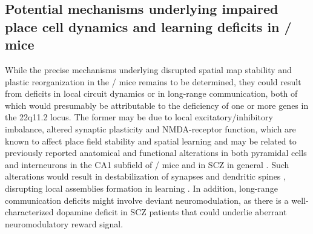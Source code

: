 \subsection{Potential mechanisms underlying impaired place cell dynamics and learning deficits in \df/ mice}

While the precise mechanisms underlying disrupted spatial map stability and plastic reorganization in the \df/ mice remains to be determined, they could result from deficits in local circuit dynamics or in long-range communication, both of which would presumably be attributable to the deficiency of one or more genes in the 22q11.2 locus. The former may be due to local excitatory/inhibitory imbalance, altered synaptic plasticity and NMDA-receptor function, which are known to affect place field stability and spatial learning \citep{Kentros2004}\citep{McHugh1996}\citep{Tsien1996} and may be related to previously reported anatomical and functional alterations in both pyramidal cells and interneurons in the CA1 subfield of \df/ mice \citep{Drew2011b}\citep{Mukai2008} and in SCZ in general \citep{Coyle2012}\citep{Crabtree2014}. Such alterations would result in destabilization of synapses and dendritic spines \citep{Fenelon2013}\citep{Mukai2015}, disrupting local assemblies formation in learning \citep{Holtmaat2016}. In addition, long-range communication deficits might involve deviant neuromodulation, as there is a well-characterized dopamine deficit in SCZ patients \citep{Howes2009} that could underlie aberrant neuromodulatory reward signal.

